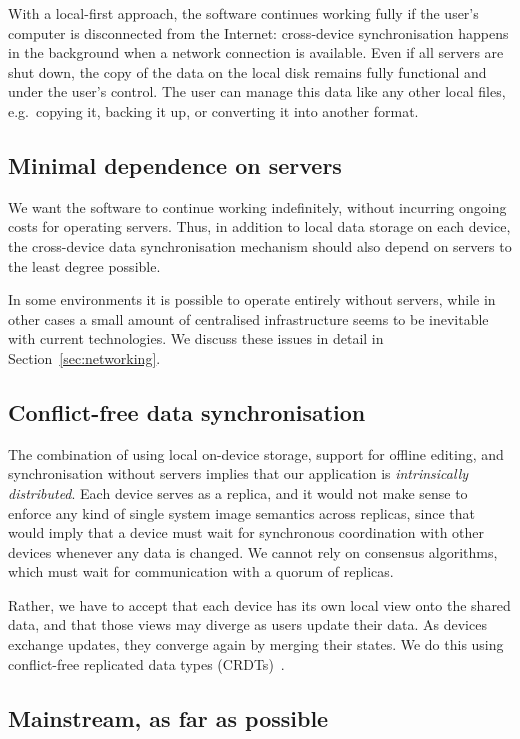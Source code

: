 \documentclass[sigplan,10pt]{acmart}
\begin{document}
With a local-first approach, the software continues working fully if the user's computer is disconnected from the Internet: cross-device synchronisation happens in the background when a network connection is available.
Even if all servers are shut down, the copy of the data on the local disk remains fully functional and under the user's control.
The user can manage this data like any other local files, e.g.\ copying it, backing it up, or converting it into another format.

\subsection{Minimal dependence on servers}

We want the software to continue working indefinitely, without incurring ongoing costs for operating servers.
Thus, in addition to local data storage on each device, the cross-device data synchronisation mechanism should also depend on servers to the least degree possible.

In some environments it is possible to operate entirely without servers, while in other cases a small amount of centralised infrastructure seems to be inevitable with current technologies.
We discuss these issues in detail in Section~\ref{sec:networking}.

\subsection{Conflict-free data synchronisation}

The combination of using local on-device storage, support for offline editing, and synchronisation without servers implies that our application is \emph{intrinsically distributed}.
Each device serves as a replica, and it would not make sense to enforce any kind of single system image semantics across replicas, since that would imply that a device must wait for synchronous coordination with other devices whenever any data is changed.
We cannot rely on consensus algorithms, which must wait for communication with a quorum of replicas.

Rather, we have to accept that each device has its own local view onto the shared data, and that those views may diverge as users update their data.
As devices exchange updates, they converge again by merging their states.
We do this using conflict-free replicated data types (CRDTs)~\cite{Shapiro:2011un}.

\subsection{Mainstream, as far as possible}
\end{document}
